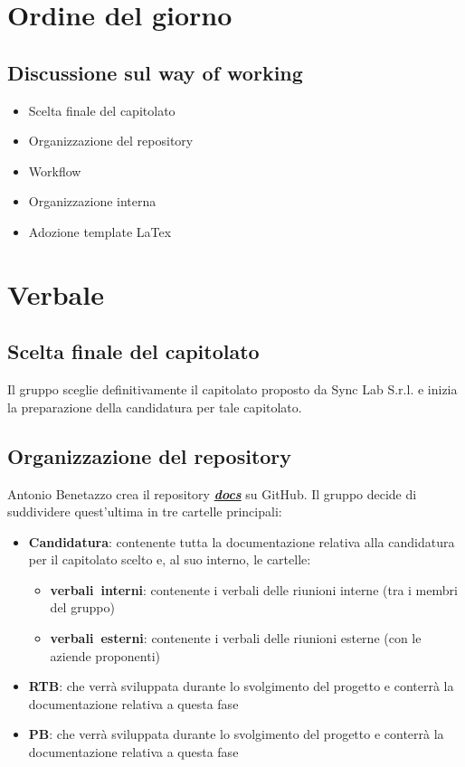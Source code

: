 \documentclass[italian,12pt]{article} %
\begin{document}
\section{Ordine del giorno}
\subsection{Discussione sul way of working}
\begin{flushleft}
	\begin{itemize}
		\item Scelta finale del capitolato
		\item Organizzazione del repository
		\item Workflow
		\item Organizzazione interna
		\item Adozione template LaTex
	\end{itemize}
\end{flushleft}


\newpage

\section{Verbale}
\subsection{Scelta finale del capitolato}
\begin{flushleft}
	Il gruppo sceglie definitivamente il capitolato proposto da Sync Lab S.r.l. e inizia la preparazione della candidatura per tale capitolato.
\end{flushleft}
\subsection{Organizzazione del repository}
\begin{flushleft}
	Antonio Benetazzo crea il repository \href{https://github.com/7Last/docs}{ \textbf{\textit{docs}}} su GitHub.
	Il gruppo decide di suddividere quest'ultima in tre cartelle principali: 
	\begin{itemize}
		\item \textbf{Candidatura}: contenente tutta la documentazione relativa alla candidatura per il capitolato scelto e, al suo interno, le cartelle:
		\begin{itemize}
			\item \textbf{verbali\ interni}: contenente i verbali delle riunioni interne (tra i membri del gruppo)
			\item \textbf{verbali\ esterni}: contenente i verbali delle riunioni esterne (con le aziende proponenti)
			\end{itemize}
		\item \textbf{RTB}: che verrà sviluppata durante lo svolgimento del progetto e conterrà la documentazione relativa a questa fase
		\item \textbf{PB}: che verrà sviluppata durante lo svolgimento del progetto e conterrà la documentazione relativa a questa fase
	\end{itemize}
\end{flushleft}
\end{document}

